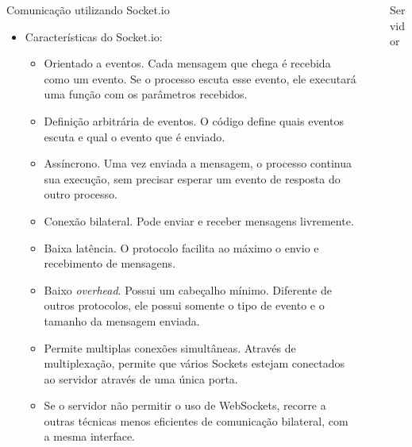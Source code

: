 \documentclass[final,hyperref={pdfpagelabels=false}]{beamer}
\begin{document}
\begin{frame}[t]
\begin{columns}[t]
\begin{column}{.465\textwidth}
\begin{block}{Comunicação utilizando Socket.io}
\begin{itemize}
\item Características do Socket.io:
\begin{itemize}
\item Orientado a eventos. Cada mensagem que chega é recebida como um evento. Se o processo escuta esse evento, ele executará uma função com os parâmetros recebidos.
\item Definição arbitrária de eventos. O código define quais eventos escuta e qual o evento que é enviado.
\item Assíncrono. Uma vez enviada a mensagem, o processo continua sua execução, sem precisar esperar um evento de resposta do outro processo.
\item Conexão bilateral. Pode enviar e receber mensagens livremente.
\item Baixa latência. O protocolo facilita ao máximo o envio e recebimento de mensagens.
\item Baixo \emph{overhead}. Possui um cabeçalho mínimo. Diferente de outros protocolos, ele possui somente o tipo de evento e o tamanho da mensagem enviada.
\item Permite multiplas conexões simultâneas. Através de multiplexação, permite que vários Sockets estejam conectados ao servidor através de uma única porta.
\item Se o servidor não permitir o uso de WebSockets, recorre a outras técnicas menos eficientes de comunicação bilateral, com a mesma interface.
\end{itemize}

\end{itemize}

\end{block}


\end{column} %

\begin{column}{.03\textwidth}\end{column} %

\begin{column}{.465\textwidth} %


\begin{block}{Servidor}


\end{block}
\end{column}
\end{columns}
\end{frame}
\end{document}

